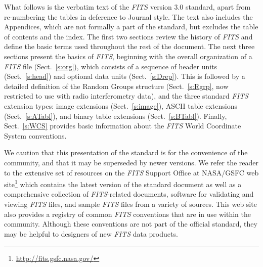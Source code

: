 \documentclass[onecolumn]{aa}
\begin{document}
\ifaastyle


What follows is the verbatim text of the {\em FITS} version 3.0 standard, apart from
re-numbering the tables in deference to Journal style.  The text also includes
the Appendices, which are not formally a part of the standard, but excludes
the table of contents and the index.  The first two sections review the history
of {\em FITS} and define the basic terms used throughout the rest of the document. 
The next three sections present the basics of {\em FITS}, beginning with the overall
organization of a {\em FITS} file (Sect.\ \ref{s:org}), which consists of a sequence of
header units (Sect.\ \ref{s:head}) and optional data units (Sect.\ \ref{s:Drep}).  
This is followed by a detailed definition of the Random Groups structure 
(Sect.\ \ref{s:Rgrp}, now restricted to use with radio interferometry data), and the three
standard {\em FITS} extension types: image extensions (Sect.\ \ref{s:image}), ASCII table
extensions  (Sect.\ \ref{s:ATabl}), and binary table extensions (Sect.\ \ref{s:BTabl}).
Finally, Sect.\ \ref{s:WCS} provides basic information about the {\em FITS} 
World Coordinate System conventions. 

We caution that this presentation of the standard is for the
convenience of the community, and that it may be superseded by newer versions.
We refer the reader to the extensive set of resources on the {\em FITS} Support
Office at NASA/GSFC web site\footnote{\url{http://fits.gsfc.nasa.gov/}} which
contains the latest version of the standard document as well as a comprehensive
collection of  {\em FITS}-related documents, software for validating and viewing {\em FITS}
files,  and sample {\em FITS} files from a variety of sources. This web site also
provides a registry of common {\em FITS} conventions that are in use within the
community. Although these conventions are not part of the official standard,
they may be helpful to designers of new {\em FITS} data products. 

\fi
\end{document}
